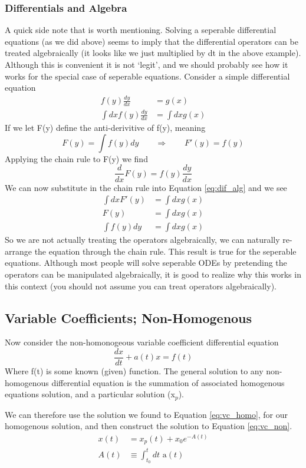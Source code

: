\documentclass{article}
\newcommand{\be}{\begin{equation}}
\newcommand{\ee}{\end{equation}}
\begin{document}
\subsubsection*{Differentials and Algebra}
A quick side note that is worth mentioning.
Solving a seperable differential equations (as we did above) seems to imply that the differential operators can be treated algebraically (it looks like we just multiplied by dt in the above example).
Although this is convenient it is not `legit', and we should probably see how it works for the special case of seperable equations.
Consider a simple differential equation
\be \label{eq:dif_alg}
\begin{split}
    f(y) \frac{dy}{dx} &= g(x)\\
    \int dx f(y) \frac{dy}{dx} &= \int dx g(x)
\end{split}
\ee
If we let F(y) define the anti-derivitive of f(y), meaning
\be
F(y) = \int f(y) dy \qquad \Rightarrow \qquad F'(y) = f(y)
\ee
Applying the chain rule to F(y) we find
\be
\frac{d}{dx} F(y) = f(y) \frac{dy}{dx}
\ee
We can now substitute in the chain rule into Equation \ref{eq:dif_alg} and we see 
\be
\begin{split}
    \int dx F'(y) &= \int dx g(x)\\
    F(y) &= \int dx g(x) \\
    \int f(y) dy &= \int dx g(x)
\end{split}
\ee
So we are not actually treating the operators algebraically, we can naturally re-arrange the equation through the chain rule.
This result is true for the seperable equations.
Although most people will solve seperable ODEs by pretending the operators can be manipulated algebraically, it is good to realize why this works in this context (you should not assume you can treat operators algebraically). 

\subsection*{Variable Coefficients; Non-Homogenous}
Now consider the non-homonogeous variable coefficient differential equation
\be \label{eq:vc_non}
\frac{dx}{dt} + a(t) x = f(t)
\ee
Where f(t) is some known (given) function.
The general solution to any non-homogenous differential equation is the summation of associated homogenous equations solution, and a particular solution (x$_p$).

We can therefore use the solution we found to Equation \ref{eq:vc_homo}, for our homogenous solution, and then construct the solution to Equation \ref{eq:vc_non}.
\be
\begin{split}
    x(t) &= x_p(t) + x_0 e^{-A(t)}\\
    A(t) & \equiv \int_{t_0}^t dt \text{ a}(t)
\end{split}
\ee
\end{document}
